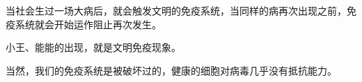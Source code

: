 \begin{zhihuanswer}
当社会生过一场大病后，就会触发文明的免疫系统，当同样的病再次出现之前，免疫系统就会开始运作阻止再次发生。

小王、能能的出现，就是文明免疫现象。

当然，我们的免疫系统是被破坏过的，健康的细胞对病毒几乎没有抵抗能力。
\end{zhihuanswer}
